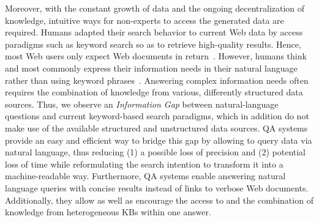 Moreover, with the constant growth of data and the ongoing decentralization of knowledge, intuitive ways for non-experts to access the generated data are required. 
Humans adapted their search behavior to current Web data by access paradigms such as keyword search so as to retrieve high-quality results.
Hence, most Web users only expect Web documents in return~\cite{ilprints361}.
However, humans think and most commonly express their information needs  in their natural language rather than using keyword phrases~\cite{woods1973progress}. 
Answering complex information needs often requires the combination of knowledge from various, differently structured data sources.
Thus, we observe an \emph{Information Gap} between natural-language questions and current keyword-based search paradigms, which in addition do not make use of the available structured and unstructured data sources.
\ac{QA} systems provide an easy and efficient way to bridge this gap by allowing to query data via natural language, thus reducing (1) a possible loss of precision and (2) potential loss of time while reformulating the search intention to transform it into a machine-readable way.
Furthermore, QA systems enable answering natural language queries with concise results instead of  links to verbose Web documents. 
Additionally, they allow as well as encourage the access  to and the combination of knowledge from heterogeneous \ac{KB}s within one answer.

